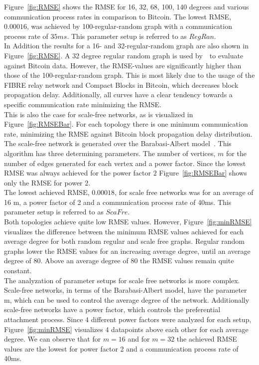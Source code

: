 Figure~\ref{fig:RMSE} shows the RMSE for 16, 32, 68, 100, 140 degrees and various communication process rates in comparison to Bitcoin. The lowest RMSE, $0.00016$, was achieved by 100-regular-random graph with a communication process rate of $35ms$. This parameter setup is referred to as $RegRan$.\\
In Addition the results for a 16- and 32-regular-random graph are also shown in Figure~\ref{fig:RMSE}. A 32 degree regular random graph is used by~~to evaluate against Bitcoin data. However, the RMSE-values are significantly higher than those of the 100-regular-random graph. This is most likely due to the usage of the FIBRE relay network and Compact Blocks in Bitcoin, which decreases block propagation delay. Additionally, all curves have a clear tendency towards a specific communication rate minimizing the RMSE.\\
This is also the case for scale-free networks, as is visualized in Figure~\ref{fig:RMSEBar}. For each topology there is one minimum communication rate, minimizing the RMSE against Bitcoin block propagation delay distribution. The scale-free network is generated over the Barabasi-Albert model~\cite{BarabasiAlbert}. This algorithm has three determining parameters. The number of vertices, $m$ for the number of edges generated for each vertex and a power factor. Since the lowest RMSE was always achieved for the power factor $2$ Figure~\ref{fig:RMSEBar} shows only the RMSE for power $2$.\\
The lowest achieved RMSE, $0.00018$, for scale free networks was for an average of 16 m, a power factor of 2 and a communication process rate of 40ms. This parameter setup is referred to as $ScaFre$.\\
Both topologies achieve quite low RMSE values. However, Figure~\ref{fig:minRMSE} visualizes the difference between the minimum RMSE values achieved for each average degree for both random regular and scale free graphs.
Regular random graphs lower the RMSE values for an increasing average degree, until an average degree of 80. Above an average degree of 80 the RMSE values remain quite constant.\\
The analyzation of parameter setups for scale free networks is more complex. Scale-free networks, in terms of the Barabasi-Albert model, have the parameter m, which can be used to control the average degree of the network. Additionally scale-free networks have a power factor, which controls the preferential attachment process. Since 4 different power factors were analyzed for each setup, Figure~\ref{fig:minRMSE} visualizes 4 datapoints above each other for each average degree. We can observe that for $m=16$ and for $m=32$ the achieved RMSE values are the lowest for power factor 2 and a communication process rate of 40ms.\\
